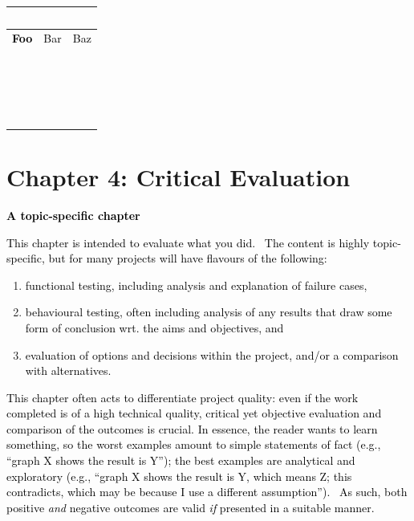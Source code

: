 \documentclass[a4paper]{article}
\makeatletter
\newcommand\liststyleWWNumxviii{%
\renewcommand\theenumi{\arabic{enumi}}
\renewcommand\labelenumi{\theenumi.}
\renewcommand\labelitemi{o}
\renewcommand\labelitemii{[F0A7?]}
\renewcommand\labelitemiii{[F0B7?]}
}
\newcommand\captionof[1]{\def\@captype{#1}\caption}
\makeatother
\begin{document}
\captionof{figure}[Example table caption]{\hypertarget{Toc98342047}{}\textcolor{black}{Example table caption}}
\begin{flushleft}
\tablefirsthead{}
\tablehead{}
\tabletail{}
\tablelasttail{}
\begin{supertabular}{m{5.1270003cm}|m{5.1270003cm}|m{5.1270003cm}}
 &
 &
~
\\\hline
{\bfseries \textcolor{black}{Foo}} &
{ \textcolor{black}{Bar}} &
{ \textcolor{black}{Baz}}\\\hline
~
 &
~
 &
~
\\\hline
~
 &
~
 &
~
\\\hline
~
 &
~
 &
~
\\\hline
~
 &
~
 &
~
\\\hline
\end{supertabular}
\end{flushleft}

\bigskip

\clearpage\section{Chapter 4: Critical Evaluation}
\hypertarget{Toc98342037}{}
\bigskip

\textbf{\textcolor{black}{A topic-specific chapter}}


\bigskip

\textcolor{black}{This chapter is intended to evaluate what you did. \ The content is highly topic-specific, but for
many projects will have flavours of the following:}


\bigskip

\liststyleWWNumxviii
\begin{enumerate}
\item \textcolor{black}{functional testing, including analysis and explanation of failure cases,}
\item \textcolor{black}{behavioural testing, often including analysis of any results that draw some form of conclusion
wrt. the aims and objectives, and}
\item \textcolor{black}{evaluation of options and decisions within the project, and/or a comparison with alternatives.}
\end{enumerate}

\bigskip

\textcolor{black}{This chapter often acts to differentiate project quality: even if the work completed is of a high
technical quality, critical yet objective evaluation and comparison of the outcomes is crucial. In essence, the reader
wants to learn something, so the worst examples amount to simple statements of fact (e.g., ``graph X shows the result
is Y''); the best examples are analytical and exploratory (e.g., ``graph X shows the result is Y, which means Z; this
contradicts, which may be because I use a different assumption''). \ As such, both positive
}\textit{\textcolor{black}{and}}\textcolor{black}{ negative outcomes are valid
}\textit{\textcolor{black}{if}}\textcolor{black}{ presented in a suitable manner.}
\end{document}
